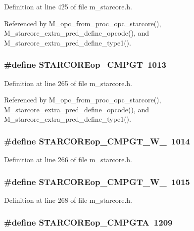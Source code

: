 Definition at line 425 of file m\_\-starcore.h.

Referenced by M\_\-opc\_\-from\_\-proc\_\-opc\_\-starcore(), M\_\-starcore\_\-extra\_\-pred\_\-define\_\-opcode(), and M\_\-starcore\_\-extra\_\-pred\_\-define\_\-type1().
\subsubsection{\setlength{\rightskip}{0pt plus 5cm}\#define STARCOREop\_\-CMPGT~1013}\label{m__starcore_8h_c7f6a06421934bb30646ac77c7846fd2}




Definition at line 265 of file m\_\-starcore.h.

Referenced by M\_\-opc\_\-from\_\-proc\_\-opc\_\-starcore(), M\_\-starcore\_\-extra\_\-pred\_\-define\_\-opcode(), and M\_\-starcore\_\-extra\_\-pred\_\-define\_\-type1().
\subsubsection{\setlength{\rightskip}{0pt plus 5cm}\#define STARCOREop\_\-CMPGT\_\-W\_~1014}\label{m__starcore_8h_cb9c03309de0b791e748a65d7b832977}




Definition at line 266 of file m\_\-starcore.h.
\subsubsection{\setlength{\rightskip}{0pt plus 5cm}\#define STARCOREop\_\-CMPGT\_\-W\_~1015}\label{m__starcore_8h_9f6ca446020ed40b832e36e3566a9860}




Definition at line 268 of file m\_\-starcore.h.
\subsubsection{\setlength{\rightskip}{0pt plus 5cm}\#define STARCOREop\_\-CMPGTA~1209}\label{m__starcore_8h_ea920f7aaf7579dbda6724dfe31695f9}




